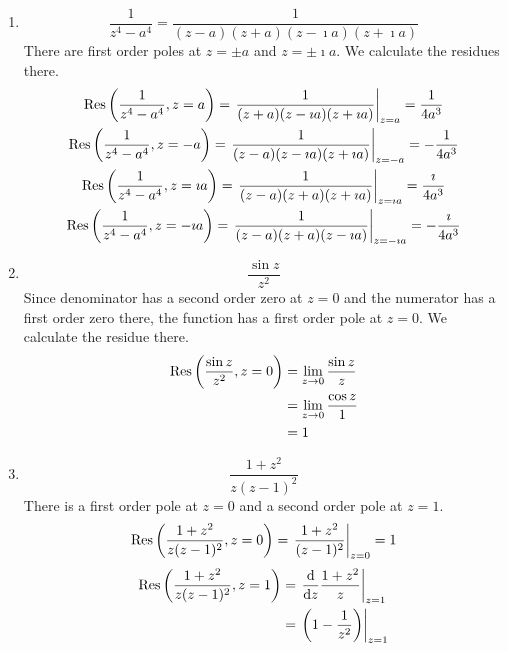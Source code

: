 {\begin{Solution}
  \label{solution calculate residues 1 z4-a4}
  \begin{enumerate}
  \item 
    \[
    \frac{1}{z^4 - a^4} 
    = \frac{1}{ (z - a) (z + a) (z - \imath a) (z + \imath a) }
    \]
    There are first order poles at $z = \pm a$ and $z = \pm \imath a$.  We calculate 
    the residues there.
    \begin{gather*}
      \mathop{\mathrm{Res}}\nolimits \left( \frac{1}{z^4 - a^4}, z = a \right)
      = \left. \frac{1}{ (z + a) (z - \imath a) (z + \imath a) } \right|_{z = a}
      = \frac{1}{4 a^3}
      \\
      \mathop{\mathrm{Res}}\nolimits \left( \frac{1}{z^4 - a^4}, z = - a \right)
      = \left. \frac{1}{ (z - a) (z - \imath a) (z + \imath a) } \right|_{z = - a}
      = - \frac{1}{4 a^3}
      \\
      \mathop{\mathrm{Res}}\nolimits \left( \frac{1}{z^4 - a^4}, z = \imath a \right)
      = \left. \frac{1}{ (z - a) (z + a) (z + \imath a) } \right|_{z = \imath a}
      = \frac{\imath}{4 a^3}
      \\
      \mathop{\mathrm{Res}}\nolimits \left( \frac{1}{z^4 - a^4}, z = - \imath a \right)
      = \left. \frac{1}{ (z - a) (z + a) (z - \imath a) } \right|_{z = - \imath a}
      = - \frac{\imath}{4 a^3}
    \end{gather*}
  \item 
    \[
    \frac{\sin z}{z^2}
    \]
    Since denominator has a second order zero at $z = 0$ and the numerator 
    has a first order zero there, the function has a first order pole at 
    $z = 0$.  We calculate the residue there.
    \begin{align*}
      \mathop{\mathrm{Res}}\nolimits \left( \frac{\sin z}{z^2}, z = 0 \right)
      &= \lim_{z \to 0} \frac{\sin z}{z}
      \\
      &= \lim_{z \to 0} \frac{\cos z}{1}
      \\
      &= 1
    \end{align*}
  \item 
    \[
    \frac{1 + z^2}{z (z - 1)^2}
    \]
    There is a first order pole at $z = 0$ and a second order pole at $z = 1$.
    \[
    \mathop{\mathrm{Res}}\nolimits \left( \frac{1 + z^2}{z (z - 1)^2}, z = 0 \right)
    = \left. \frac{1 + z^2}{(z - 1)^2} \right|_{z = 0}
    = 1
    \]
    \begin{align*}
      \Res \left( \frac{1 + z^2}{z (z - 1)^2}, z = 1 \right)
      &= \left. \frac{\dd}{\dd z} \frac{1 + z^2}{z} \right|_{z = 1}
      \\
      &= \left. \left( 1 - \frac{1}{z^2} \right) \right|_{z = 1}

\end{align*}
\end{enumerate}
\end{Solution}}
